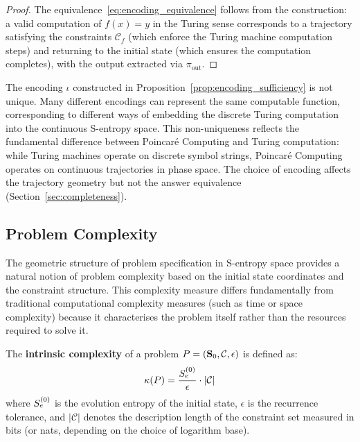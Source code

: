 \begin{proof}
The equivalence~\eqref{eq:encoding_equivalence} follows from the construction: a valid computation of $f(x) = y$ in the Turing sense corresponds to a trajectory satisfying the constraints $\mathcal{C}_f$ (which enforce the Turing machine computation steps) and returning to the initial state (which ensures the computation completes), with the output extracted via $\pi_{\text{out}}$.
\end{proof}

\begin{remark}
\label{rem:encoding_nonunique}
The encoding $\iota$ constructed in Proposition~\ref{prop:encoding_sufficiency} is not unique. Many different encodings can represent the same computable function, corresponding to different ways of embedding the discrete Turing computation into the continuous S-entropy space. This non-uniqueness reflects the fundamental difference between Poincaré Computing and Turing computation: while Turing machines operate on discrete symbol strings, Poincaré Computing operates on continuous trajectories in phase space. The choice of encoding affects the trajectory geometry but not the answer equivalence (Section~\ref{sec:completeness}).
\end{remark}

\subsection{Problem Complexity}

The geometric structure of problem specification in S-entropy space provides a natural notion of problem complexity based on the initial state coordinates and the constraint structure. This complexity measure differs fundamentally from traditional computational complexity measures (such as time or space complexity) because it characterises the problem itself rather than the resources required to solve it.

\begin{definition}
\label{def:complexity_measure}
The \textbf{intrinsic complexity} of a problem $P = (\mathbf{S}_0, \mathcal{C}, \epsilon)$ is defined as:
\begin{equation}
\kappa(P) = \frac{S_e^{(0)}}{\epsilon} \cdot |\mathcal{C}|
\label{eq:complexity_measure}
\end{equation}
where $S_e^{(0)}$ is the evolution entropy of the initial state, $\epsilon$ is the recurrence tolerance, and $|\mathcal{C}|$ denotes the description length of the constraint set measured in bits (or nats, depending on the choice of logarithm base).
\end{definition}

